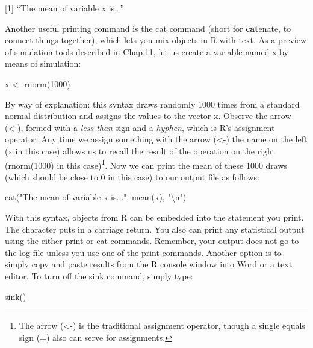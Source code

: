 \documentclass[
]{book}
\newenvironment{Shaded}{\begin{snugshade}}{\end{snugshade}}
\newcommand{\DecValTok}[1]{\textcolor[rgb]{0.00,0.00,0.81}{#1}}
\newcommand{\FunctionTok}[1]{\textcolor[rgb]{0.00,0.00,0.00}{#1}}
\newcommand{\NormalTok}[1]{#1}
\newcommand{\OtherTok}[1]{\textcolor[rgb]{0.56,0.35,0.01}{#1}}
\newcommand{\SpecialCharTok}[1]{\textcolor[rgb]{0.00,0.00,0.00}{#1}}
\newcommand{\StringTok}[1]{\textcolor[rgb]{0.31,0.60,0.02}{#1}}
\begin{document}
{[}1{]} ``The mean of variable x is\ldots{}''

Another useful printing command is the cat command (short for \textbf{cat}enate, to connect things together), which lets you mix objects in R with text. As a preview of simulation tools described in Chap.11, let us create a variable named x by means of simulation:

\begin{Shaded}
\begin{Highlighting}[]
\NormalTok{x }\OtherTok{\textless{}{-}} \FunctionTok{rnorm}\NormalTok{(}\DecValTok{1000}\NormalTok{)}
\end{Highlighting}
\end{Shaded}

By way of explanation: this syntax draws randomly 1000 times from a standard normal distribution and assigns the values to the vector x. Observe the arrow (\textless-), formed with a \emph{less than} sign and a \emph{hyphen}, which is R's assignment operator. Any time we assign something with the arrow (\textless-) the name on the left (x in this case) allows us to recall the result of the operation on the right (rnorm(1000) in this case)\footnote{The arrow (\textless-) is the traditional assignment operator, though a single equals sign (=) also can serve for assignments.}. Now we can print the mean of these 1000 draws (which should be close to 0 in this case) to our output file as follows:

\begin{Shaded}
\begin{Highlighting}[]
\FunctionTok{cat}\NormalTok{(}\StringTok{"The mean of variable x is..."}\NormalTok{, }\FunctionTok{mean}\NormalTok{(x), }\StringTok{"}\SpecialCharTok{\textbackslash{}n}\StringTok{"}\NormalTok{)}
\end{Highlighting}
\end{Shaded}

With this syntax, objects from R can be embedded into the statement you print. The character \n puts in a carriage return. You also can print any statistical output using the either print or cat commands. Remember, your output does not go to the log file unless you use one of the print commands. Another option is to simply copy and paste results from the R console window into Word or a text editor. To turn off the sink command, simply type:

\begin{Shaded}
\begin{Highlighting}[]
\FunctionTok{sink}\NormalTok{()}
\end{Highlighting}
\end{Shaded}
\end{document}
